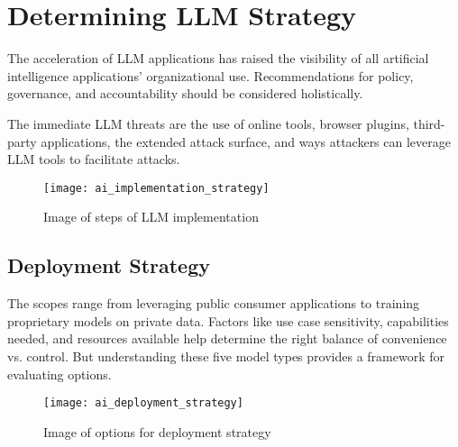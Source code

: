 

\headerimage

\chapter{Determining LLM Strategy}

The acceleration of LLM applications has raised the visibility of all
artificial intelligence applications' organizational use. Recommendations for
policy, governance, and accountability should be considered holistically.

The immediate LLM threats are the use of online tools, browser plugins,
third-party applications, the extended attack surface, and ways attackers can
leverage LLM tools to facilitate attacks.

\begin{figure}[h]
  \centering
  \texttt{[image: ai\_implementation\_strategy]}
  \caption{Image of steps of LLM implementation}
  \label{fig:llm-implementation-strategy}
\end{figure}

\clearpage

\section{Deployment Strategy}

The scopes range from leveraging public consumer applications to training
proprietary models on private data. Factors like use case sensitivity,
capabilities needed, and resources available help determine the right balance
of convenience vs. control. But understanding these five model types provides a
framework for evaluating options.

\begin{figure}[h]
  \centering
  \texttt{[image: ai\_deployment\_strategy]}
  \caption{Image of options for deployment strategy}
  \label{fig:llm-deployment-strategy}
\end{figure}
